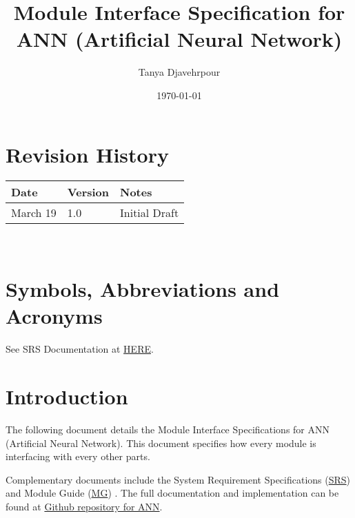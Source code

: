 \documentclass[12pt, titlepage]{article}
\begin{document}
\title{Module Interface Specification for ANN (Artificial Neural Network)}

\author{Tanya Djavehrpour}

\date{\today}

\maketitle


\section{Revision History}

\begin{tabularx}{\textwidth}{p{3cm}p{2cm}X}
\toprule {\bf Date} & {\bf Version} & {\bf Notes}\\
\midrule
March 19 & 1.0 & Initial Draft\\
\bottomrule
\end{tabularx}

~\newpage

\section{Symbols, Abbreviations and Acronyms}

See SRS Documentation \cite{SRS} at \href{https://github.com/tanya-jp/ANN-CAS741/blob/main/docs/SRS/SRS.pdf}{HERE}.

\newpage

\tableofcontents

\newpage


\section{Introduction}

The following document details the Module Interface Specifications for
ANN (Artificial Neural Network). This document specifies how every module 
is interfacing with every other parts.

Complementary documents include the System Requirement Specifications 
(\href{https://github.com/tanya-jp/ANN-CAS741/blob/main/docs/SRS/SRS.pdf}{SRS}) \cite{SRS}
and Module Guide (\href{https://github.com/tanya-jp/ANN-CAS741/blob/main/docs/Design/SoftArchitecture/MG.pdf}{MG}) \cite{MG}.  
The full documentation and implementation can be
found at \href{https://github.com/tanya-jp/ANN-CAS741/tree/main}{Github repository for ANN}.
\end{document}
